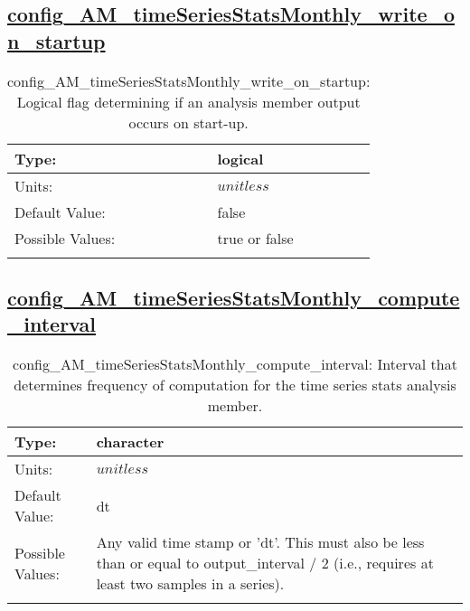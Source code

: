 \subsection[config\_AM\_timeSeriesStatsMonthly\_write\_on\_startup]{\hyperref[sec:nm_tab_AM_timeSeriesStatsMonthly]{config\_AM\_timeSeriesStatsMonthly\_write\_on\_startup}}
\label{subsec:nm_sec_config_AM_timeSeriesStatsMonthly_write_on_startup}
\begin{center}
\begin{longtable}{| p{2.0in} || p{4.0in} |}
    \hline
    Type: & logical \\
    \hline
    Units: & $unitless$ \\
    \hline
    Default Value: & false \\
    \hline
    Possible Values: & true or false \\
    \hline
    \caption{config\_AM\_timeSeriesStatsMonthly\_write\_on\_startup: Logical flag determining if an analysis member output occurs on start-up.}
\end{longtable}
\end{center}
\subsection[config\_AM\_timeSeriesStatsMonthly\_compute\_interval]{\hyperref[sec:nm_tab_AM_timeSeriesStatsMonthly]{config\_AM\_timeSeriesStatsMonthly\_compute\_interval}}
\label{subsec:nm_sec_config_AM_timeSeriesStatsMonthly_compute_interval}
\begin{center}
\begin{longtable}{| p{2.0in} || p{4.0in} |}
    \hline
    Type: & character \\
    \hline
    Units: & $unitless$ \\
    \hline
    Default Value: & dt \\
    \hline
    Possible Values: & Any valid time stamp or 'dt'. This must also be less than or equal to output\_interval / 2 (i.e., requires at least two samples in a series). \\
    \hline
    \caption{config\_AM\_timeSeriesStatsMonthly\_compute\_interval: Interval that determines frequency of computation for the time series stats analysis member.}
\end{longtable}
\end{center}

